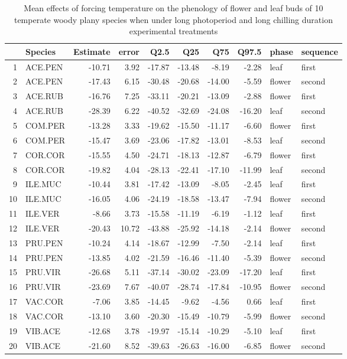 \documentclass{article}\usepackage[]{graphicx}\usepackage[]{color}
\begin{document}
\begin{table}[ht]
\centering
\begin{tabular}{rlrrrrrrll}
  \hline
 & Species & Estimate & error & Q2.5 & Q25 & Q75 & Q97.5 & phase & sequence \\ 
  \hline
1 & ACE.PEN & -10.71 & 3.92 & -17.87 & -13.48 & -8.19 & -2.28 & leaf & first \\ 
  2 & ACE.PEN & -17.43 & 6.15 & -30.48 & -20.68 & -14.00 & -5.59 & flower & second \\ 
  3 & ACE.RUB & -16.76 & 7.25 & -33.11 & -20.21 & -13.09 & -2.88 & flower & first \\ 
  4 & ACE.RUB & -28.39 & 6.22 & -40.52 & -32.69 & -24.08 & -16.20 & leaf & second \\ 
  5 & COM.PER & -13.28 & 3.33 & -19.62 & -15.50 & -11.17 & -6.60 & flower & first \\ 
  6 & COM.PER & -15.47 & 3.69 & -23.06 & -17.82 & -13.01 & -8.53 & leaf & second \\ 
  7 & COR.COR & -15.55 & 4.50 & -24.71 & -18.13 & -12.87 & -6.79 & flower & first \\ 
  8 & COR.COR & -19.82 & 4.04 & -28.13 & -22.41 & -17.10 & -11.99 & leaf & second \\ 
  9 & ILE.MUC & -10.44 & 3.81 & -17.42 & -13.09 & -8.05 & -2.45 & leaf & first \\ 
  10 & ILE.MUC & -16.05 & 4.06 & -24.19 & -18.58 & -13.47 & -7.94 & flower & second \\ 
  11 & ILE.VER & -8.66 & 3.73 & -15.58 & -11.19 & -6.19 & -1.12 & leaf & first \\ 
  12 & ILE.VER & -20.43 & 10.72 & -43.88 & -25.92 & -14.18 & -2.14 & flower & second \\ 
  13 & PRU.PEN & -10.24 & 4.14 & -18.67 & -12.99 & -7.50 & -2.14 & leaf & first \\ 
  14 & PRU.PEN & -13.85 & 4.02 & -21.59 & -16.46 & -11.40 & -5.39 & flower & second \\ 
  15 & PRU.VIR & -26.68 & 5.11 & -37.14 & -30.02 & -23.09 & -17.20 & leaf & first \\ 
  16 & PRU.VIR & -23.69 & 7.67 & -40.07 & -28.74 & -17.84 & -10.95 & flower & second \\ 
  17 & VAC.COR & -7.06 & 3.85 & -14.45 & -9.62 & -4.56 & 0.66 & leaf & first \\ 
  18 & VAC.COR & -13.10 & 3.60 & -20.30 & -15.49 & -10.79 & -5.99 & flower & second \\ 
  19 & VIB.ACE & -12.68 & 3.78 & -19.97 & -15.14 & -10.29 & -5.10 & leaf & first \\ 
  20 & VIB.ACE & -21.60 & 8.52 & -39.63 & -26.63 & -16.00 & -6.85 & flower & second \\ 
   \hline
\end{tabular}
\caption{Mean effects of forcing temperature on the phenology of flower and leaf buds of 10 temperate woody plany species when under long photoperiod and long chilling duration experimental treatments } 
\label{tab:phh}
\end{table}
\end{document}
